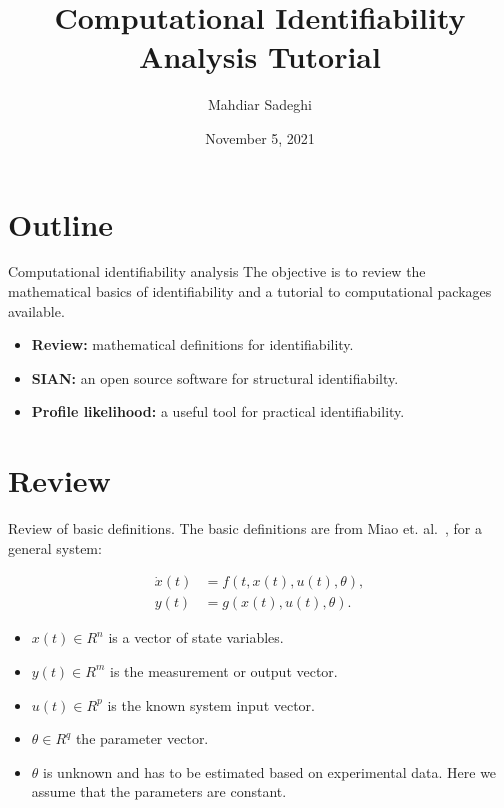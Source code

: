 \documentclass[10pt]{beamer}
\title[Identifiability Tutorial]{Computational Identifiability Analysis Tutorial}
\author{Mahdiar Sadeghi}
\date{November 5, 2021}
\begin{document}
\begin{frame}
\titlepage %
\end{frame}

\section{Outline}

\begin{frame}{Computational identifiability analysis}
	The objective is to review the mathematical basics of identifiability and a tutorial to computational packages available. 
	\vspace{15pt}
    \begin{itemize}
        \setlength\itemsep{1em}
        \item \textbf{Review:} mathematical definitions for identifiability.
        
        \item \textbf{SIAN:} an open source software for structural identifiabilty.
    
    	\item \textbf{Profile likelihood:} a useful tool for practical identifiability.
    \end{itemize}
\end{frame}

\section{Review}

\begin{frame}{Review of basic definitions.}
	The basic definitions are from Miao et. al.~, for a general system:
	
	\begin{subequations}
		\begin{align}
			\dot x (t) &= f(t,x(t),u(t),\theta), \\
			y(t) &= g(x(t), u(t), \theta).
		\end{align}
	\end{subequations}
	
	\begin{itemize}
		\item $x(t) \in R^n$ is a vector of state variables.
		\item $y(t) \in R^m$ is the measurement or output vector.
		\item $u(t) \in R^p$ is the known system input vector.
		\item $\theta \in R^q$ the parameter vector.
		\item $\theta$ is unknown and has to be estimated based on experimental data. Here we assume that the parameters are constant.
	\end{itemize}
\end{frame}
\end{document}
